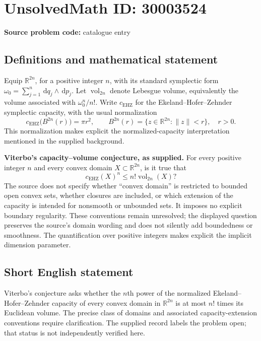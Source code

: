 \documentclass[11pt]{article}
\newcommand{\R}{\mathbb{R}}
\newcommand{\dd}{\,\mathrm{d}}
\begin{document}
\section*{UnsolvedMath ID: 30003524}
\textbf{Source problem code:} catalogue entry
\subsection{Definitions and mathematical statement}
Equip \(\R^{2n}\), for a positive integer \(n\), with its standard symplectic form \(\omega_0=\sum_{j=1}^n \dd q_j\wedge\dd p_j\). Let \(\operatorname{vol}_{2n}\) denote Lebesgue volume, equivalently the volume associated with \(\omega_0^n/n!\). Write \(c_{\mathrm{EHZ}}\) for the Ekeland--Hofer--Zehnder symplectic capacity, with the usual normalization
\[
c_{\mathrm{EHZ}}\bigl(B^{2n}(r)\bigr)=\pi r^2,
\qquad B^{2n}(r)=\{z\in\R^{2n}:\lVert z\rVert<r\},\quad r>0.
\]
This normalization makes explicit the normalized-capacity interpretation mentioned in the supplied background.

\textbf{Viterbo's capacity--volume conjecture, as supplied.} For every positive integer \(n\) and every convex domain \(X\subset\R^{2n}\), is it true that
\[
c_{\mathrm{EHZ}}(X)^n\leq n!\operatorname{vol}_{2n}(X)?
\]
The source does not specify whether ``convex domain'' is restricted to bounded open convex sets, whether closures are included, or which extension of the capacity is intended for nonsmooth or unbounded sets. It imposes no explicit boundary regularity. These conventions remain unresolved; the displayed question preserves the source's domain wording and does not silently add boundedness or smoothness. The quantification over positive integers makes explicit the implicit dimension parameter.
\subsection{Short English statement}
Viterbo's conjecture asks whether the \(n\)th power of the normalized Ekeland--Hofer--Zehnder capacity of every convex domain in \(\R^{2n}\) is at most \(n!\) times its Euclidean volume. The precise class of domains and associated capacity-extension conventions require clarification. The supplied record labels the problem open; that status is not independently verified here.
\end{document}
